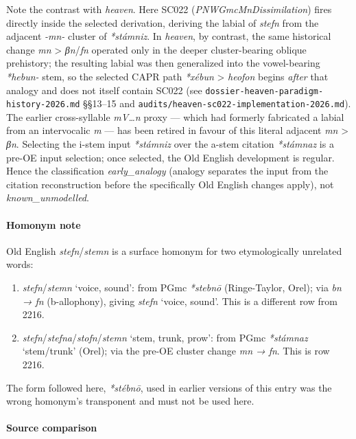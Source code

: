 \documentclass[
  british,
  a4paper,
]{article}
\providecommand{\tightlist}{%
  \setlength{\itemsep}{0pt}\setlength{\parskip}{0pt}}
\providecommand{\Recon}[1]{\emph{*#1}}
\begin{document}
Note the contrast with \emph{heaven}. Here SC022
(\emph{PNWGmcMnDissimilation}) fires directly inside the selected
derivation, deriving the labial of \emph{stefn} from the adjacent
\emph{-mn-} cluster of \emph{*stámniz}. In \emph{heaven}, by contrast,
the same historical change \emph{mn} \textgreater{} \emph{βn}/\emph{fn}
operated only in the deeper cluster-bearing oblique prehistory; the
resulting labial was then generalized into the vowel-bearing
\emph{*hebun-} stem, so the selected CAPR path \emph{*xébun}
\textgreater{} \emph{heofon} begins \emph{after} that analogy and does
not itself contain SC022 (see
\texttt{dossier-heaven-paradigm-history-2026.md} §§13--15 and
\texttt{audits/heaven-sc022-implementation-2026.md}). The earlier
cross-syllable \emph{mV\ldots n} proxy --- which had formerly fabricated
a labial from an intervocalic \emph{m} --- has been retired in favour of
this literal adjacent \emph{mn} \textgreater{} \emph{βn}. Selecting the
i-stem input \emph{*stámniz} over the a-stem citation \emph{*stámnaz} is
a pre-OE input selection; once selected, the Old English development is
regular. Hence the classification \emph{early\_analogy} (analogy
separates the input from the citation reconstruction before the
specifically Old English changes apply), not \emph{known\_unmodelled}.

\paragraph{Homonym note}\label{homonym-note}

Old English \emph{stefn}/\emph{stemn} is a surface homonym for two
etymologically unrelated words:

\begin{enumerate}
\def\labelenumi{\arabic{enumi}.}
\tightlist
\item
  \emph{stefn}/\emph{stemn} `voice, sound': from PGmc \emph{*stebnō}
  (Ringe-Taylor, Orel); via \emph{bn → fn} (b-allophony), giving
  \emph{stefn} `voice, sound'. This is a different row from 2216.
\item
  \emph{stefn}/\emph{stefna}/\emph{stofn}/\emph{stemn} `stem, trunk,
  prow': from PGmc \Recon{stámnaz} `stem/trunk' (Orel); via the pre-OE
  cluster change \emph{mn → fn}. This is row 2216.
\end{enumerate}

The form followed here, \emph{*stébnō}, used in earlier versions of this
entry was the wrong homonym's transponent and must not be used here.

\paragraph{Source comparison}\label{source-comparison}
\end{document}
